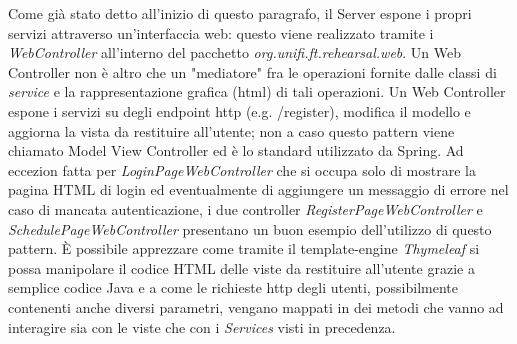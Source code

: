 Come già stato detto all'inizio di questo paragrafo, il Server espone i propri servizi attraverso un'interfaccia web: questo viene realizzato tramite i \textsl{WebController} all'interno del pacchetto \textsl{org.unifi.ft.rehearsal.web}.\newline\newline
Un Web Controller non è altro che un "mediatore" fra le operazioni fornite dalle classi di \textsl{service} e la rappresentazione grafica (html) di tali operazioni. Un Web Controller espone i servizi su degli endpoint http (e.g. /register), modifica il modello e aggiorna la vista da restituire all'utente; non a caso questo pattern viene chiamato Model View Controller ed è lo standard utilizzato da Spring.\newline
Ad eccezion fatta per \textsl{LoginPageWebController} che si occupa solo di mostrare la pagina HTML di login ed eventualmente di aggiungere un messaggio di errore nel caso di mancata autenticazione, i due controller \textsl{RegisterPageWebController} e \textsl{SchedulePageWebController} presentano un buon esempio dell'utilizzo di questo pattern. È possibile apprezzare come tramite il template-engine \textsl{Thymeleaf} si possa manipolare il codice HTML delle viste da restituire all'utente grazie a semplice codice Java e a come le richieste http degli utenti, possibilmente contenenti anche diversi parametri, vengano mappati in dei metodi che vanno ad interagire sia con le viste che con i \textsl{Services} visti in precedenza.
